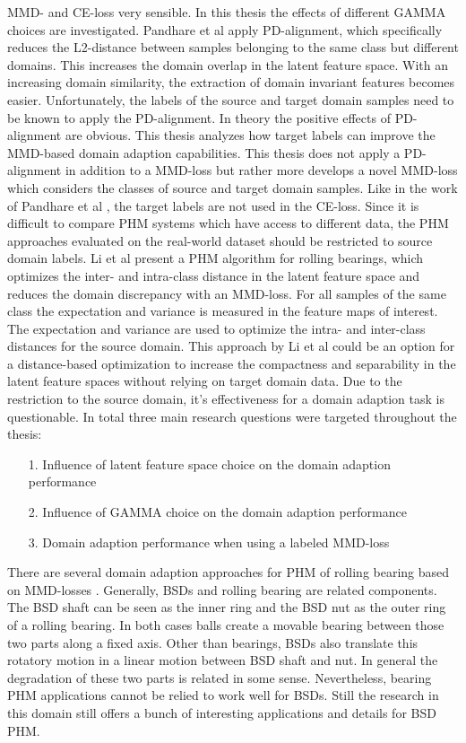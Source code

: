 MMD- and CE-loss very sensible. In this thesis the effects of different GAMMA choices are investigated. Pandhare et al \cite{Pandhare2021} apply PD-alignment, which specifically reduces the L2-distance between samples belonging to the same class but different domains. This increases the domain overlap in the latent feature space. With an increasing domain similarity, the extraction of domain invariant features becomes easier. Unfortunately, the labels of the source and target domain samples need to be known to apply the PD-alignment. In theory the positive effects of PD-alignment are obvious. This thesis analyzes how target labels can improve the MMD-based domain adaption capabilities. This thesis does not apply a PD-alignment in addition to a MMD-loss but rather more develops a novel MMD-loss which considers the classes of source and target domain samples. Like in the work of Pandhare et al \cite{Pandhare2021}, the target labels are not used in the CE-loss. Since it is difficult to compare PHM systems which have access to different data, the PHM approaches evaluated on the real-world dataset should be restricted to source domain labels. Li et al \cite{Li2018} present a PHM algorithm for rolling bearings, which optimizes the inter- and intra-class distance in the latent feature space and reduces the domain discrepancy with an MMD-loss. For all samples of the same class the expectation and variance is measured in the feature maps of interest. The expectation and variance are used to optimize the intra- and inter-class distances for the source domain. This approach by Li et al could be an option for a distance-based optimization to increase the compactness and separability in the latent feature spaces without relying on target domain data. Due to the restriction to the source domain, it's effectiveness for a domain adaption task is questionable. In total three main research questions were targeted throughout the thesis:
\begin{itemize}
    \item [1.] Influence of latent feature space choice on the domain adaption performance
    \item [2.] Influence of GAMMA choice on the domain adaption performance
    \item [3.] Domain adaption performance when using a labeled MMD-loss
\end{itemize}

There are several domain adaption approaches for PHM of rolling bearing based on MMD-losses \cite{Guo2019} \cite{Singh2019} \cite{Li2018} \cite{AN201942} \cite{Kang2020}. Generally, BSDs and rolling bearing are related components. The BSD shaft can be seen as the inner ring and the BSD nut as the outer ring of a rolling bearing. In both cases balls create a movable bearing between those two parts along a fixed axis. Other than bearings, BSDs also translate this rotatory motion in a linear motion between BSD shaft and nut. In general the degradation of these two parts is related in some sense. Nevertheless, bearing PHM applications cannot be relied to work well for BSDs. Still the research in this domain still offers a bunch of interesting applications and details for BSD PHM. 

